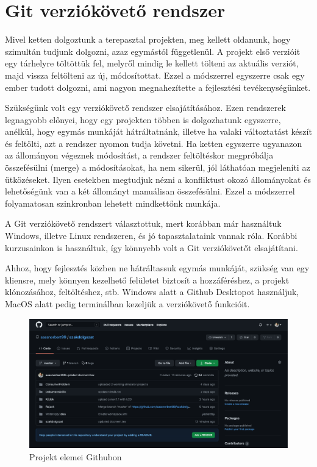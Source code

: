 \documentclass[
]{thesis-ekf}
\theoremstyle{definition}
\theoremstyle{remark}
\begin{document}
	\section{Git verziókövető rendszer}
	Mivel ketten dolgoztunk a terepasztal projekten, meg kellett oldanunk, hogy szimultán tudjunk dolgozni, azaz egymástól függetlenül. A projekt első verzióit egy tárhelyre töltöttük fel, melyről mindig le kellett tölteni az aktuális verziót, majd vissza feltölteni az új, módosítottat. Ezzel a módszerrel egyszerre csak egy ember tudott dolgozni, ami nagyon megnahezítette a fejlesztési tevékenységünket.
	\par Szükségünk volt egy verziókövető rendszer elsajátításához. Ezen rendszerek legnagyobb előnyei, hogy egy projekten többen is dolgozhatunk egyszerre, anélkül, hogy egymás munkáját hátráltatnánk, illetve ha valaki változtatást készít és feltölti, azt a rendszer nyomon tudja követni. Ha ketten egyszerre ugyanazon az állományon végeznek módosítást, a rendszer feltöltéskor megpróbálja összefésülni (merge) a módosításokat, ha nem sikerül, jól láthatóan megjeleníti az ütközéseket. Ilyen esetekben megtudjuk nézni a konfliktust okozó állományokat és lehetőségünk van a két állományt manuálisan összefésülni. Ezzel a módszerrel folyamatosan szinkronban lehetett mindkettőnk munkája.
	\par A Git verziókövető rendszert választottuk, mert korábban már használtuk Windows, illetve Linux rendszeren, és jó tapasztalataink vannak róla. Korábbi kurzusainkon is használtuk, így könnyebb volt a Git verziókövetőt elsajátítani. 
	\par Ahhoz, hogy fejlesztés közben ne hátráltassuk egymás munkáját, szükség van egy kliensre, mely könnyen kezelhető felületet biztosít a hozzáféréshez, a projekt klónozásához, feltöltéshez, stb. Windows alatt a Github Desktopot használjuk, MacOS alatt pedig terminálban kezeljük a verziókövető funkcióit.
	\begin{figure}[ht]
		\centering
		\includegraphics[scale=0.35]{./images/github}
		\caption{Projekt elemei Githubon}
		\label{fig:github}
	\end{figure}
\end{document}
